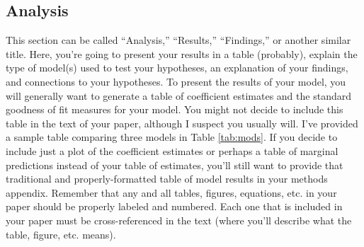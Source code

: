 \documentclass[12pt]{article}
\begin{document}
\hypertarget{analysis}{%
\subsection{Analysis}\label{analysis}}

This section can be called ``Analysis,'' ``Results,'' ``Findings,'' or another similar title. Here, you're going to present your results in a table (probably), explain the type of model(s) used to test your hypotheses, an explanation of your findings, and connections to your hypotheses. To present the results of your model, you will generally want to generate a table of coefficient estimates and the standard goodness of fit measures for your model. You might not decide to include this table in the text of your paper, although I suspect you usually will. I've provided a sample table comparing three models in Table \ref{tab:mods}. If you decide to include just a plot of the coefficient estimates or perhaps a table of marginal predictions instead of your table of estimates, you'll still want to provide that traditional and properly-formatted table of model results in your methods appendix. Remember that any and all tables, figures, equations, etc. in your paper should be properly labeled and numbered. Each one that is included in your paper must be cross-referenced in the text (where you'll describe what the table, figure, etc. means).
\end{document}
